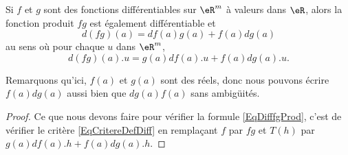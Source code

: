 \begin{lemma}		\label{LemDiffProsuid}
	Si $f$ et $g$ sont des fonctions différentiables sur $\eR^m$ à valeurs dans $\eR$, alors la fonction produit $fg$ est également différentiable et
	\begin{equation}		\label{EqDifffgProd}
		d(fg)(a)=df(a)g(a)+f(a)dg(a)
	\end{equation}
	au sens où pour chaque $u$ dans $\eR^m$,
	\begin{equation}
		d(fg)(a).u=g(a)df(a).u+f(a)dg(a).u.
	\end{equation}
\end{lemma}
Remarquons qu'ici, $f(a)$ et $g(a)$ sont des réels, donc nous pouvons écrire $f(a)dg(a)$ aussi bien que $dg(a)f(a)$ sans ambigüités. 

\begin{proof}
	Ce que nous devons faire pour vérifier la formule \ref{EqDifffgProd}, c'est de vérifier le critère \eqref{EqCritereDefDiff} en remplaçant $f$ par $fg$ et $T(h)$ par $g(a)df(a).h+f(a)dg(a).h$.


\end{proof}
